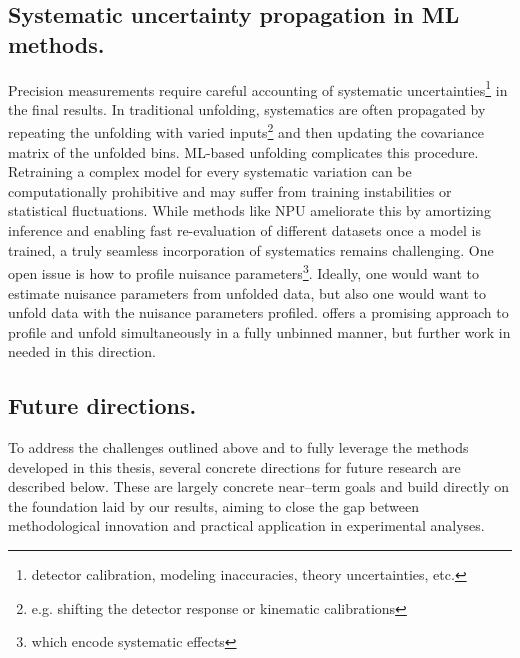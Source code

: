     \subsection{Systematic uncertainty propagation in ML methods.}
        Precision measurements require careful accounting of systematic uncertainties\footnote{detector calibration, modeling inaccuracies, theory uncertainties, etc.} in the final results.
        In traditional unfolding, systematics are often propagated by repeating the unfolding with varied inputs\footnote{e.g. shifting the detector response or kinematic calibrations} and then updating the covariance matrix of the unfolded bins.
        ML-based unfolding complicates this procedure.
        Retraining a complex model for every systematic variation can be computationally prohibitive and may suffer from training instabilities or statistical fluctuations.
        While methods like NPU ameliorate this by amortizing inference and enabling fast re-evaluation of different datasets once a model is trained, a truly seamless incorporation of systematics remains challenging.
        One open issue is how to profile nuisance parameters\footnote{which encode systematic effects}.
        Ideally, one would want to estimate nuisance parameters from unfolded data, but also one would want to unfold data with the nuisance parameters profiled.
        \cite{zhu2024multidimensional} offers a promising approach to profile and unfold simultaneously in a fully unbinned manner, but further work in needed in this direction.

        \subsection{Future directions.}
            To address the challenges outlined above and to fully leverage the methods developed in this thesis, several concrete directions for future research are described below.
            These are largely concrete near--term goals and build directly on the foundation laid by our results, aiming to close the gap between methodological innovation and practical application in experimental analyses.

